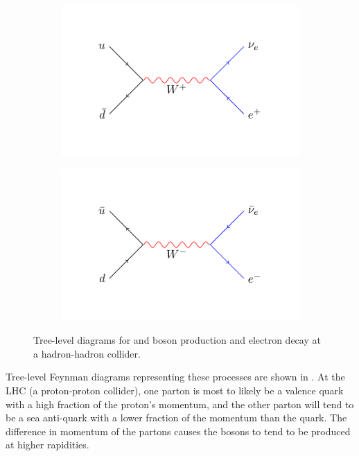 \begin{figure}[htbp]
  \centering
  \begin{subfigure}{0.45\textwidth}
    \centering
    \includegraphics[width=\textwidth]{w_process_wp}
    \caption{\HepProcess{\Pup + \APdown \to \PWp \to \Pleptonplus \Pnulepton}}
    \label{fig:w_process_wp}
  \end{subfigure}
  \begin{subfigure}{0.45\textwidth}
    \centering
    \includegraphics[width=\textwidth]{w_process_wm}
    \caption{\HepProcess{\APup + \Pdown \to \PWm \to \Pleptonminus \APnulepton}}
    \label{fig:w_process_wm}
  \end{subfigure}
  \caption{Tree-level diagrams for \PWp and \PWm boson production and electron
decay at a hadron-hadron collider.}\label{fig:w_process} 
\end{figure}

Tree-level Feynman diagrams representing these processes are shown in
.
At the {LHC} (a proton-proton collider), one parton is most to likely be a
valence quark with a high fraction of the proton's momentum, and the other
parton will tend to be a sea anti-quark with a lower fraction of the momentum
than the quark. The difference in momentum of the partons causes the \PW bosons 
to tend to be produced at higher rapidities. 

